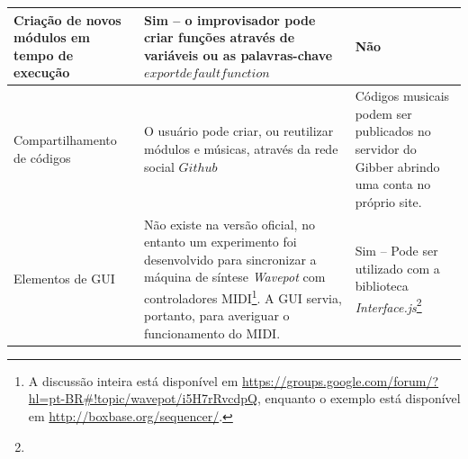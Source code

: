 \begin{table}[ht!]
\begin{tabular}{ p{4cm} | p{5cm} | p{5cm}}
    Criação de novos módulos em tempo de execução  & \small Sim -- o improvisador pode criar funções através de variáveis ou as palavras-chave $export default function$ & Não \\
    \hline
    Compartilhamento de códigos &
    O usuário pode criar, ou reutilizar módulos e músicas, através da rede social $Github$  & 
    Códigos musicais podem ser publicados no servidor do Gibber abrindo uma conta no próprio site. \\
    \hline 
    Elementos de GUI &
    \small Não existe na versão oficial, no entanto um experimento foi desenvolvido para sincronizar a máquina de síntese \emph{Wavepot} com controladores MIDI\footnote{A discussão inteira está disponível em \url{https://groups.google.com/forum/?hl=pt-BR#!topic/wavepot/i5H7rRvcdpQ}, enquanto o exemplo está disponível em \url{http://boxbase.org/sequencer/}.}. A GUI servia, portanto, para averiguar o funcionamento do MIDI.  &
    Sim -- Pode ser utilizado com a biblioteca \emph{Interface.js}\footnote{} \\
    \hline
    \hline
    \end{tabular}
\label{tab:comparacao}
\end{table}


